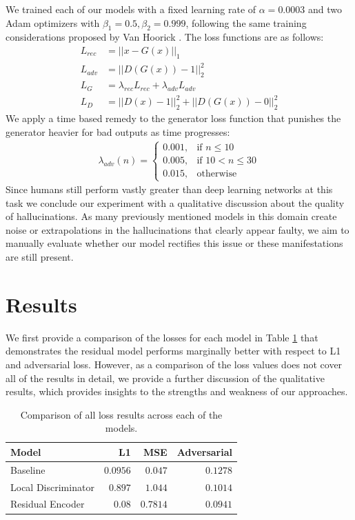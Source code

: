\documentclass{article}
\begin{document}
We trained each of our models with a fixed learning rate of $\alpha=0.0003$ and two Adam optimizers with $\beta_1=0.5, \beta_2=0.999$, following the same training considerations proposed by Van Hoorick \citep{van_hoorick_image_2020}. The loss functions are as follows:
\begin{align}
  L_{rec} &= ||x-G(x)||_1 \\
  L_{adv} &= ||D(G(x))-1||_2^2 \\
  L_G &= \lambda_{rec}L_{rec} + \lambda_{adv}L_{adv} \\
  L_D &= ||D(x)-1||_2^2 + ||D(G(x))-0||_2^2
\end{align}
We apply a time based remedy to the generator loss function that punishes the generator heavier for bad outputs as time progresses:
\begin{align}
  \lambda_{adv}(n) = \begin{cases}
    0.001, & \text{if }n\leq10 \\
    0.005, & \text{if }10<n\leq30 \\
    0.015, & \text{otherwise}
  \end{cases}
\end{align}
Since humans still perform vastly greater than deep learning networks at this task we conclude our experiment with a qualitative discussion about the quality of hallucinations. As many previously mentioned models in this domain create noise or extrapolations in the hallucinations that clearly appear faulty, we aim to manually evaluate whether our model rectifies this issue or these manifestations are still present.

\section{Results}
We first provide a comparison of the losses for each model in Table \ref{tab:4} that demonstrates the residual model performs marginally better with respect to L1 and adversarial loss. However, as a comparison of the loss values does not cover all of the results in detail, we provide a further discussion of the qualitative results, which provides insights to the strengths and weakness of our approaches.

\begin{table}[h] 
  \centering  
    \begin{tabular}{lrrr}
    \hline
    \textbf{Model} & \textbf{L1} & \textbf{MSE} & \textbf{Adversarial}\\ 
    \hline \hline
      Baseline & $0.0956$ & $0.047$ & $0.1278$ \\
      Local Discriminator & $0.897$ & $1.044$ & $0.1014$ \\
      Residual Encoder & $0.08$ & $0.7814$ & $0.0941$ \\
    \hline
    \end{tabular}
  
  \caption{Comparison of all loss results across each of the models.} 
  \label{tab:4}
\end{table}
\end{document}
